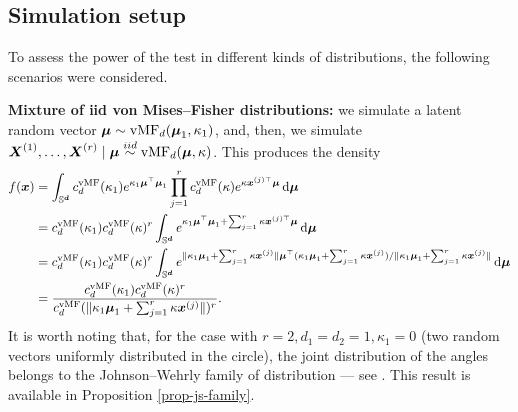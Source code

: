\documentclass[oneside,11pt]{article}
\begin{document}
\subsection{Simulation setup}

To assess the power of the test in different kinds of distributions, the following scenarios were considered.

\textbf{Mixture of iid von Mises--Fisher distributions:} we simulate a latent random vector $\boldsymbol\mu \sim \mathrm{vMF}_d (\boldsymbol\mu_1, \kappa_1)$, and, then, we simulate $\boldsymbol{X}^{(1)}, \dots, \boldsymbol{X}^{(r)} \mid \boldsymbol\mu \stackrel {iid}\sim  \mathrm{vMF}_d (\boldsymbol\mu, \kappa)$. This produces the density
    \begin{align*}
        f(\boldsymbol{x}) &= \int_{\mathbb{S}^{\boldsymbol{d}}} c^\mathrm{vMF}_{d}(\kappa_1) e^{\kappa_1\boldsymbol\mu^{\top}\boldsymbol\mu_1} \prod_{j=1}^{r} c^\mathrm{vMF}_{d}(\kappa) e^{\kappa\boldsymbol{x}^{(j) \top}\boldsymbol\mu} \,\mathrm{d} \boldsymbol\mu \\
        &= c^\mathrm{vMF}_{d}(\kappa_1) c^\mathrm{vMF}_{d}(\kappa)^r \int_{\mathbb{S}^{\boldsymbol{d}}} e^{\kappa_1\boldsymbol\mu^{\top}\boldsymbol\mu_1 + \sum_{j=1}^{r} \kappa\boldsymbol{x}^{(j) \top}\boldsymbol\mu} \,\mathrm{d} \boldsymbol\mu\\
        &= c^\mathrm{vMF}_{d}(\kappa_1) c^\mathrm{vMF}_{d}(\kappa)^r \int_{\mathbb{S}^{\boldsymbol{d}}} e^{\|\kappa_1\boldsymbol\mu_1 + \sum_{j=1}^{r} \kappa\boldsymbol{x}^{(j)}\|\boldsymbol\mu^{\top}(\kappa_1\boldsymbol\mu_1 + \sum_{j=1}^{r} \kappa\boldsymbol{x}^{(j)})/\|\kappa_1\boldsymbol\mu_1 + \sum_{j=1}^{r} \kappa\boldsymbol{x}^{(j)}\|} \,\mathrm{d} \boldsymbol\mu\\
        &= \frac{c^\mathrm{vMF}_{d}(\kappa_1) c^\mathrm{vMF}_{d}(\kappa)^r}{ c^\mathrm{vMF}_{d}(\|\kappa_1\boldsymbol\mu_1 + \sum_{j=1}^{r} \kappa\boldsymbol{x}^{(j)}\|)^r}.
\end{align*}
It is worth noting that, for the case with $r=2, d_1 = d_2 = 1, \kappa_1 = 0$ (two random vectors uniformly distributed in the circle), the joint distribution of the angles belongs to the  Johnson--Wehrly family of distribution --- see \cite{Johnson1978,Wehrly1980}. This result is available in Proposition \ref{prop-js-family}.

\end{document}
